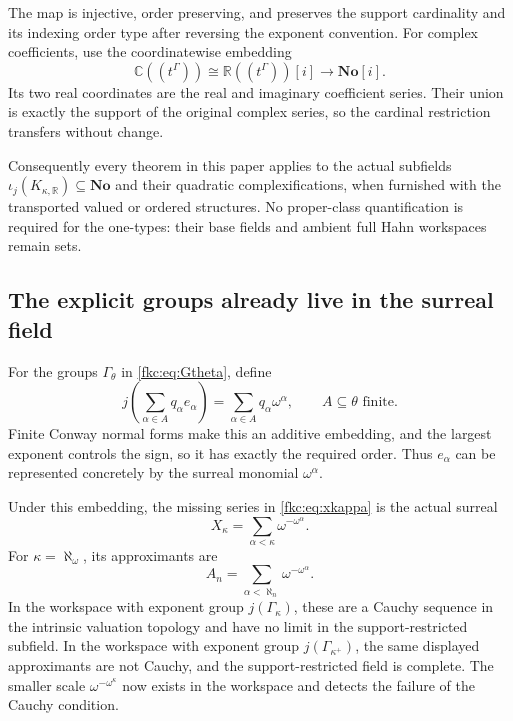\documentclass[11pt,letterpaper]{article}
\numberwithin{equation}{section}
\theoremstyle{definition}
\theoremstyle{remark}
\newcommand{\R}{\mathbb R}
\newcommand{\C}{\mathbb C}
\newcommand{\No}{\mathbf{No}}
\begin{document}
The map is injective, order preserving, and preserves the support cardinality and its indexing order type after reversing the exponent convention. For complex coefficients, use the coordinatewise embedding
\begin{equation}\label{fkc:eq:complexconway}
 \C((t^\Gamma))\cong\R((t^\Gamma))[i]
 \longrightarrow\No[i].
\end{equation}
Its two real coordinates are the real and imaginary coefficient series. Their union is exactly the support of the original complex series, so the cardinal restriction transfers without change.

Consequently every theorem in this paper applies to the actual subfields $\iota_j(K_{\kappa,\R})\subseteq\No$ and their quadratic complexifications, when furnished with the transported valued or ordered structures. No proper-class quantification is required for the one-types: their base fields and ambient full Hahn workspaces remain sets.

\subsection{The explicit groups already live in the surreal field}
For the groups $\Gamma_\theta$ in \eqref{fkc:eq:Gtheta}, define
\[
 j\left(\sum_{\alpha\in A}q_\alpha e_\alpha\right)
    =\sum_{\alpha\in A}q_\alpha\omega^\alpha,
 \qquad A\subseteq\theta\text{ finite}.
\]
Finite Conway normal forms make this an additive embedding, and the largest exponent controls the sign, so it has exactly the required order. Thus $e_\alpha$ can be represented concretely by the surreal monomial $\omega^\alpha$.

Under this embedding, the missing series in \eqref{fkc:eq:xkappa} is the actual surreal
\begin{equation}\label{fkc:eq:actualx}
 \boxed{\ X_\kappa=\sum_{\alpha<\kappa}\omega^{-\omega^\alpha}.\ }
\end{equation}
For $\kappa=\aleph_\omega$, its approximants are
\[
 A_n=\sum_{\alpha<\aleph_n}\omega^{-\omega^\alpha}.
\]
In the workspace with exponent group $j(\Gamma_\kappa)$, these are a Cauchy sequence in the intrinsic valuation topology and have no limit in the support-restricted subfield. In the workspace with exponent group $j(\Gamma_{\kappa^+})$, the same displayed approximants are not Cauchy, and the support-restricted field is complete. The smaller scale $\omega^{-\omega^\kappa}$ now exists in the workspace and detects the failure of the Cauchy condition.
\end{document}
